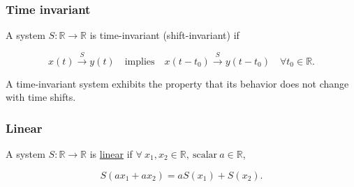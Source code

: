     \begin{example}
    \end{example}

    \subsubsection{Time invariant}
    \begin{definition}
        A system \( S: \mathbb{R} \to \mathbb{R} \) is time-invariant (shift-invariant) if

        \[
        x(t) \xrightarrow{S} y(t) \quad \text{implies} \quad x(t - t_0) \xrightarrow{S} y(t - t_0) \quad \forall t_0 \in \mathbb{R}.
        \]
    \end{definition}
    \begin{intuition}
        A time-invariant system exhibits the property that its behavior does not change with time shifts. 
    \end{intuition}

    \begin{example}

    \end{example}

    \subsubsection{Linear}
    \begin{definition}
        A system \( S: \mathbb{R} \to \mathbb{R} \) is \underline{linear} if \( \forall \ x_1, x_2 \in \mathbb{R}, \ \text{scalar} \ a \in \mathbb{R} \),

        \[
        S(a x_1 + a x_2) = a S(x_1) + S(x_2).
        \]
    \end{definition}

